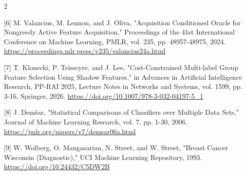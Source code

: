 \documentclass[10pt,a4paper]{article}
\begin{document}
\begin{multicols}{2}
\begin{minipage}{\linewidth}{\fontsize{7}{8.2}\selectfont \begin{latin}[6] M. Valancius, M. Lennon, and J. Oliva, "Acquisition Conditioned Oracle for Nongreedy Active Feature Acquisition," Proceedings of the 41st International Conference on Machine Learning, PMLR, vol. 235, pp. 48957-48975, 2024. \url{https://proceedings.mlr.press/v235/valancius24a.html}\end{latin}\par}\end{minipage}\par
\begin{minipage}{\linewidth}{\fontsize{7}{8.2}\selectfont \begin{latin}[7] T. Klonecki, P. Teisseyre, and J. Lee, "Cost-Constrained Multi-label Group Feature Selection Using Shadow Features," in Advances in Artificial Intelligence Research, PP-RAI 2025, Lecture Notes in Networks and Systems, vol. 1599, pp. 3-16, Springer, 2026. \url{https://doi.org/10.1007/978-3-032-04197-5_1}\end{latin}\par}\end{minipage}\par
\begin{minipage}{\linewidth}{\fontsize{7}{8.2}\selectfont \begin{latin}[8] J. Demšar, "Statistical Comparisons of Classifiers over Multiple Data Sets," Journal of Machine Learning Research, vol. 7, pp. 1-30, 2006. \url{https://jmlr.org/papers/v7/demsar06a.html}\end{latin}\par}\end{minipage}\par
\begin{minipage}{\linewidth}{\fontsize{7}{8.2}\selectfont \begin{latin}[9] W. Wolberg, O. Mangasarian, N. Street, and W. Street, "Breast Cancer Wisconsin (Diagnostic)," UCI Machine Learning Repository, 1993. \url{https://doi.org/10.24432/C5DW2B}\end{latin}\par}\end{minipage}\par
\end{multicols}
\end{document}
